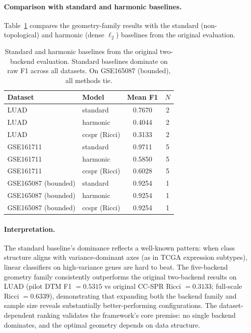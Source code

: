 \documentclass[11pt]{article}
\begin{document}
\paragraph{Comparison with standard and harmonic baselines.}
Table~\ref{tab:baselines} compares the geometry-family results with the standard (non-topological) and harmonic (dense $\ell_2$) baselines from the original evaluation.

\begin{table}[h]
\centering
\small
\begin{tabular}{llcc}
\toprule
Dataset & Model & Mean F1 & $N$ \\
\midrule
LUAD & standard & 0.7670 & 2 \\
LUAD & harmonic & 0.4044 & 2 \\
LUAD & ccspr (Ricci) & 0.3133 & 2 \\
\midrule
GSE161711 & standard & 0.9711 & 5 \\
GSE161711 & harmonic & 0.5850 & 5 \\
GSE161711 & ccspr (Ricci) & 0.6028 & 5 \\
\midrule
GSE165087 (bounded) & standard & 0.9254 & 1 \\
GSE165087 (bounded) & harmonic & 0.9254 & 1 \\
GSE165087 (bounded) & ccspr (Ricci) & 0.9254 & 1 \\
\bottomrule
\end{tabular}
\caption{Standard and harmonic baselines from the original two-backend evaluation.
Standard baselines dominate on raw F1 across all datasets.
On GSE165087 (bounded), all methods tie.}
\label{tab:baselines}
\end{table}

\paragraph{Interpretation.}
The standard baseline's dominance reflects a well-known pattern: when class structure aligns with variance-dominant axes (as in TCGA expression subtypes), linear classifiers on high-variance genes are hard to beat.
The five-backend geometry family consistently outperforms the original two-backend results on LUAD (pilot DTM F1 $= 0.5315$ vs original CC-SPR Ricci $= 0.3133$; full-scale Ricci $= 0.6339$), demonstrating that expanding both the backend family and sample size reveals substantially better-performing configurations.
The dataset-dependent ranking validates the framework's core premise: no single backend dominates, and the optimal geometry depends on data structure.
\end{document}
